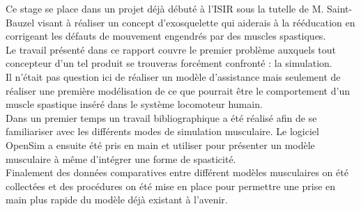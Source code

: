 Ce stage se place dans un projet déjà débuté à l'ISIR sous la tutelle de M. Saint-Bauzel visant à réaliser un concept d'exosquelette qui aiderais à la rééducation en corrigeant les défauts de mouvement engendrés par des muscles spastiques.\\

Le travail présenté dans ce rapport couvre le premier problème auxquels tout concepteur d'un tel produit se trouveras forcément confronté : la simulation.\\ 
Il n'était pas question ici de réaliser un modèle d'assistance mais seulement de réaliser une première modélisation de ce que pourrait être le comportement d'un muscle spastique inséré dans le système locomoteur humain.\\ 
Dans un premier temps un travail bibliographique a été réalisé afin de se familiariser avec les différents modes de simulation musculaire. Le logiciel OpenSim a ensuite été pris en main et utiliser pour présenter un modèle musculaire à même d'intégrer une forme de spasticité.\\ Finalement des données comparatives entre différent modèles musculaires on été collectées et des procédures on été mise en place pour permettre une prise en main plus rapide du modèle déjà existant à l'avenir. 
